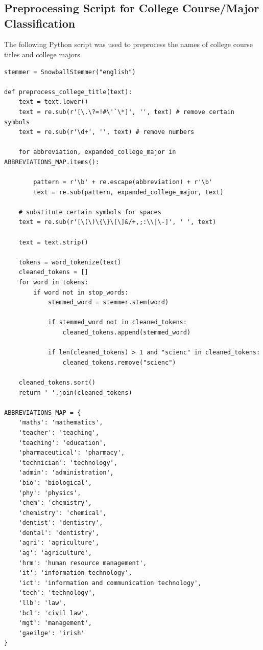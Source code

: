 \chapter{}

\section{Preprocessing Script for College Course/Major Classification}
\label{sec:preprocessing-script}

The following Python script was used to preprocess the names of college course titles and college majors.

\begin{lstlisting}
stemmer = SnowballStemmer("english")

def preprocess_college_title(text):
    text = text.lower()
    text = re.sub(r'[\.\?=!#\'`\*]', '', text) # remove certain symbols
    text = re.sub(r'\d+', '', text) # remove numbers

    for abbreviation, expanded_college_major in ABBREVIATIONS_MAP.items():
        
        pattern = r'\b' + re.escape(abbreviation) + r'\b'
        text = re.sub(pattern, expanded_college_major, text)

    # substitute certain symbols for spaces
    text = re.sub(r'[\(\)\{\}\[\]&/+,;:\\|\-]', ' ', text)

    text = text.strip()

    tokens = word_tokenize(text)
    cleaned_tokens = []
    for word in tokens:
        if word not in stop_words:
            stemmed_word = stemmer.stem(word)

            if stemmed_word not in cleaned_tokens:
                cleaned_tokens.append(stemmed_word)

            if len(cleaned_tokens) > 1 and "scienc" in cleaned_tokens:
                cleaned_tokens.remove("scienc")

    cleaned_tokens.sort()
    return ' '.join(cleaned_tokens)

ABBREVIATIONS_MAP = {
    'maths': 'mathematics',
    'teacher': 'teaching',
    'teaching': 'education',
    'pharmaceutical': 'pharmacy',
    'technician': 'technology',
    'admin': 'administration',
    'bio': 'biological',
    'phy': 'physics',
    'chem': 'chemistry',
    'chemistry': 'chemical',
    'dentist': 'dentistry',
    'dental': 'dentistry',
    'agri': 'agriculture',
    'ag': 'agriculture',
    'hrm': 'human resource management',
    'it': 'information technology',
    'ict': 'information and communication technology',
    'tech': 'technology',
    'llb': 'law',
    'bcl': 'civil law',
    'mgt': 'management',
    'gaeilge': 'irish'
}

\end{lstlisting}


